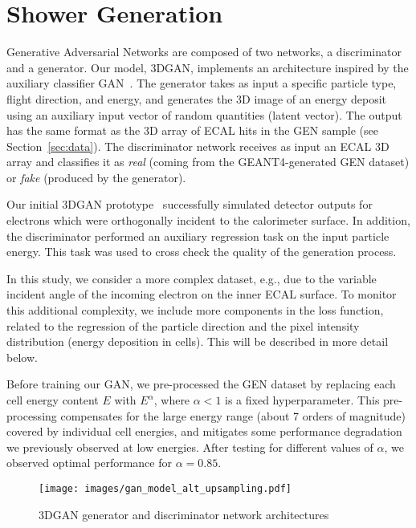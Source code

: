\chapter{Shower Generation}\label{sec:GAN}

Generative Adversarial Networks are composed of two networks, a discriminator and a generator. Our model, 3DGAN, implements an architecture inspired by the auxiliary classifier GAN~\cite{acgan}. The generator takes as input a specific particle type, flight direction, and energy, and generates the 3D image of an energy deposit using an auxiliary input vector of random quantities (latent vector). 
The output has the same format as the 3D array of ECAL hits in the GEN sample (see Section~\ref{sec:data}). The discriminator network receives as input an ECAL 3D array and classifies it as {\it real} (coming from the GEANT4-generated GEN dataset) or {\it fake} (produced by the generator).

 Our initial 3DGAN prototype~\cite{NIPS} successfully simulated detector outputs for electrons which were orthogonally incident to the calorimeter surface. In addition, the discriminator performed an auxiliary regression task on the input particle energy. This task was used to cross check the quality of the generation process. 
 
 In this study, we consider a more complex dataset, e.g., due to the variable incident angle of the incoming electron on the inner ECAL surface. To monitor this additional complexity, we include more components in the loss function, related to the regression of the particle direction and the pixel intensity distribution (energy deposition in cells). This will be described in more detail below.

Before training our GAN, we pre-processed the GEN dataset by replacing each cell energy content $E$ with $E^\alpha$, where $\alpha<1$ is a fixed hyperparameter. This pre-processing compensates for the large energy range (about 7 orders of magnitude) covered by individual cell energies, and mitigates some performance degradation we previously observed at low energies. After testing for different values of $\alpha$, we observed optimal performance for $\alpha=0.85$.

\begin{figure*}[htbp]
\centering
    \texttt{[image: images/gan\_model\_alt\_upsampling.pdf]}
    \caption{3DGAN generator and discriminator network architectures}
    \label{fig:GAN_arch}
\end{figure*}

